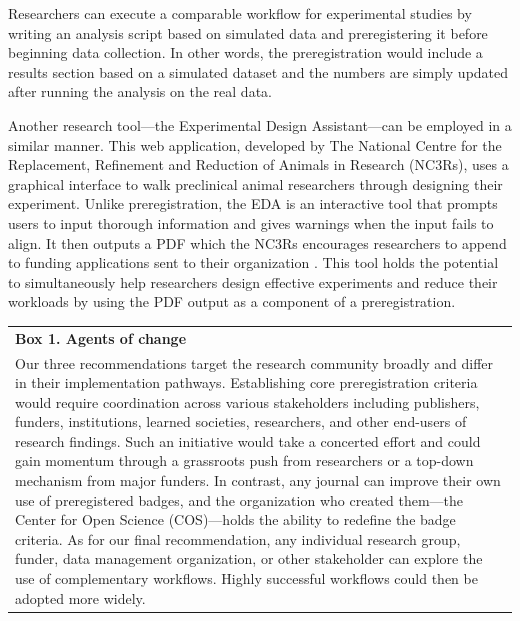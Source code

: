 \documentclass[authordate, meta]{jote-new-article}
\begin{document}
Researchers can execute a comparable workflow for experimental studies by writing an analysis script based on simulated data and preregistering it before beginning data collection. In other words, the preregistration would include a results section based on a simulated dataset and the numbers are simply updated after running the analysis on the real data.







Another research tool—the Experimental Design Assistant—can be employed in a similar manner. This web application, developed by The National Centre for the Replacement, Refinement and Reduction of Animals in Research (NC3Rs), uses a graphical interface to walk preclinical animal researchers through designing their experiment. Unlike preregistration, the EDA is an interactive tool that prompts users to input thorough information and gives warnings when the input fails to align. It then outputs a PDF which the NC3Rs encourages researchers to append to funding applications sent to their organization \parencites{NC3Rs2021}. This tool holds the potential to simultaneously help researchers design effective experiments and reduce their workloads by using the PDF output as a component of a preregistration.




\begin{table}[b!]
  \begin{fullwidth}
    \begin{tabularx}{\textwidth}{@{} X @{}}
      \textbf{Box 1. Agents of change} \\
      Our three recommendations target the research community broadly and differ in their implementation pathways. Establishing core preregistration criteria would require coordination across various stakeholders including publishers, funders, institutions, learned societies, researchers, and other end-users of research findings. Such an initiative would take a concerted effort and could gain momentum through a grassroots push from researchers or a top-down mechanism from major funders. In contrast, any journal can improve their own use of preregistered badges, and the organization who created them—the Center for Open Science (COS)—holds the ability to redefine the badge criteria. As for our final recommendation, any individual research group, funder, data management organization, or other stakeholder can explore the use of complementary workflows. Highly successful workflows could then be adopted more widely.
    \end{tabularx}
  \end{fullwidth}
\end{table}
\end{document}
